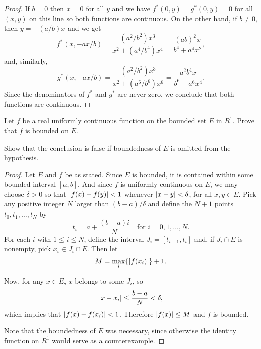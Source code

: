 \begin{proof}
  If $b = 0$ then $x = 0$ for all $y$ and we have
  $f^*(0,y) = g^*(0,y) = 0$ for all $(x,y)$ on this line so both
  functions are continuous. On the other hand, if $b\neq0$, then
  $y = -(a/b)x$ and we get
  \begin{equation*}
    f^*(x,-ax/b)
    = \frac{(a^2/b^2)x^3}{x^2 + (a^4/b^4)x^4}
    = \frac{(ab)^2x}{b^4 + a^4x^2},
  \end{equation*}
  and, similarly,
  \begin{equation*}
    g^*(x,-ax/b)
    = \frac{(a^2/b^2)x^3}{x^2 + (a^6/b^6)x^6}
    = \frac{a^2b^4x}{b^6 + a^6x^4}.
  \end{equation*}
  Since the denominators of $f^*$ and $g^*$ are never zero, we
  conclude that both functions are continuous.
\end{proof}

 Let $f$ be a real uniformly continuous function on the
bounded set $E$ in $R^1$. Prove that $f$ is bounded on $E$.

Show that the conclusion is false if boundedness of $E$ is omitted
from the hypothesis.
\begin{proof}
  Let $E$ and $f$ be as stated. Since $E$ is bounded, it is contained
  within some bounded interval $[a,b]$. And since $f$ is uniformly
  continuous on $E$, we may choose $\delta > 0$ so that
  $\lvert{f(x) - f(y)}\rvert < 1$ whenever $\lvert{x - y}\rvert < \delta$, for all
  $x,y\in E$. Pick any positive integer $N$ larger than $(b-a)/\delta$
  and define the $N+1$ points $t_0,t_1,\dots,t_N$ by
  \begin{equation*}
    t_i = a + \frac{(b-a)i}N
    \quad\text{for $i = 0, 1, \dots, N$}.
  \end{equation*}
  For each $i$ with $1\leq i\leq N$, define the interval
  $J_i = [t_{i-1},t_i]$ and, if $J_i\cap E$ is nonempty, pick
  $x_i\in J_i\cap E$. Then let
  \begin{equation*}
    M = \max\limits_i\{\lvert{f(x_i)}\rvert\} + 1.
  \end{equation*}

  Now, for any $x\in E$, $x$ belongs to some $J_i$, so
  \begin{equation*}
    \lvert{x - x_i}\rvert \leq \frac{b-a}N < \delta,
  \end{equation*}
  which implies that $\lvert{f(x) - f(x_i)}\rvert < 1$. Therefore
  $\lvert{f(x)}\rvert\leq M$ and $f$ is bounded.

  Note that the boundedness of $E$ was necessary, since otherwise the
  identity function on $R^1$ would serve as a counterexample.
\end{proof}

